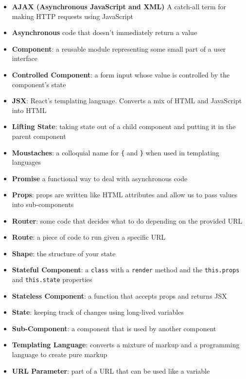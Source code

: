 \begin{itemize}[leftmargin=*]
    \item
        \textbf{AJAX (Asynchronous JavaScript and XML)}
        A catch-all term for making HTTP requests using JavaScript
    \item
        \textbf{Asynchronous}
        code that doesn't immediately return a value
    \item
        \textbf{Component}:
        a reusable module representing some small part of a user interface
    \item
        \textbf{Controlled Component}:
        a form input whose value is controlled by the component's state
    \item
        \textbf{JSX}:
        React's templating language. Converts a mix of HTML and JavaScript into HTML
    \item
        \textbf{Lifting State}:
        taking state out of a child component and putting it in the parent component
    \item
        \textbf{Moustaches}:
        a colloquial name for \texttt{\{} and \texttt{\}} when used in templating languages
    \item
        \textbf{Promise}
        a functional way to deal with asynchronous code
    \item
        \textbf{Props}:
        props are written like HTML attributes and allow us to pass values into sub-components
    \item
        \textbf{Router}:
        some code that decides what to do depending on the provided URL
    \item
        \textbf{Route}:
        a piece of code to run given a specific URL
    \item
        \textbf{Shape}:
        the structure of your state
    \item
        \textbf{Stateful Component}:
        a \texttt{class} with a \texttt{render} method and the \texttt{this.props} and \texttt{this.state} properties
    \item
        \textbf{Stateless Component}:
        a function that accepts props and returns JSX
    \item
        \textbf{State}:
        keeping track of changes using long-lived variables
    \item
        \textbf{Sub-Component}:
        a component that is used by another component
    \item
        \textbf{Templating Language}:
        converts a mixture of markup and a programming language to create pure markup
    \item
        \textbf{URL Parameter}:
        part of a URL that can be used like a variable
\end{itemize}
